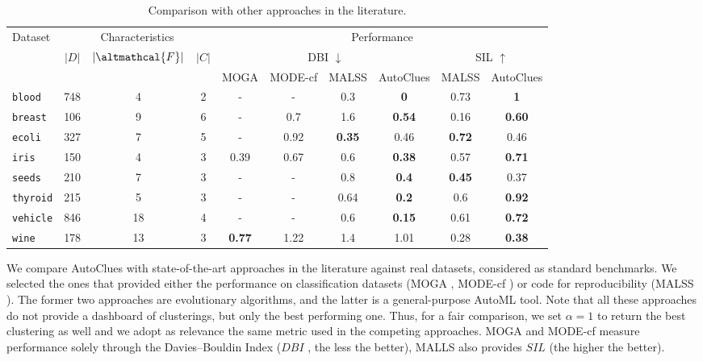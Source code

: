 \begin{table}[t]
    \centering
    \begin{tabular}{l|ccc|cccc|cc}
    \hline
        \multirow{3}{*}{Dataset} & \multicolumn{3}{c|}{Characteristics} & \multicolumn{6}{c}{Performance} \\
        & \multirow{2}{*}{$|D|$} & \multirow{2}{*}{$|\altmathcal{F}|$} & \multirow{2}{*}{$|C|$} & \multicolumn{4}{c|}{DBI $\downarrow$} & \multicolumn{2}{c}{SIL $\uparrow$} \\
        & & & & \multicolumn{1}{c}{MOGA} & \multicolumn{1}{c}{MODE-cf} & \multicolumn{1}{c}{MALSS} & \multicolumn{1}{c|}{AutoClues} & \multicolumn{1}{c}{MALSS} & \multicolumn{1}{c}{AutoClues} \\ \hline
        \texttt{blood} & 748 & 4 & 2 & - & - & 0.3 & \textbf{0} & 0.73 & \textbf{1} \\ 
        \texttt{breast} & 106 & 9 & 6 & - & 0.7 & 1.6 & \textbf{0.54} & 0.16 & \textbf{0.60} \\ 
        \texttt{ecoli} & 327 & 7 & 5 & - & 0.92 & \textbf{0.35} & 0.46 & \textbf{0.72} & 0.46 \\ 
        \texttt{iris} & 150 & 4 & 3 & 0.39 & 0.67 & 0.6 & \textbf{0.38} & 0.57 & \textbf{0.71} \\
        \texttt{seeds} & 210 & 7 & 3 & - & - & 0.8 & \textbf{0.4} & \textbf{0.45} & 0.37 \\
        \texttt{thyroid} & 215 & 5 & 3 & - & - & 0.64 & \textbf{0.2} & 0.6 & \textbf{0.92} \\ 
        \texttt{vehicle} & 846 & 18 & 4 & - & - & 0.6 & \textbf{0.15} & 0.61 & \textbf{0.72} \\ 
        \texttt{wine} & 178 & 13 & 3 & \textbf{0.77} & 1.22 & 1.4 & 1.01 & 0.28 & \textbf{0.38} \\ \hline
    \end{tabular}
    \caption{Comparison with other approaches in the literature.}
    \label{clustering-tbl:comparison}
\end{table}


We compare AutoClues with state-of-the-art approaches in the literature against real datasets, considered as standard benchmarks.
We selected the ones that provided either the performance on classification datasets (MOGA \cite{dutta2013}, MODE-cf \cite{hancer2020new}) or code for reproducibility (MALSS \cite{Kamoshida2020}).
The former two approaches are evolutionary algorithms, and the latter is a general-purpose AutoML tool.
Note that all these approaches do not provide a dashboard of clusterings, but only the best performing one.
Thus, for a fair comparison, we set $\alpha=1$ to return the best clustering as well and we adopt as relevance the same metric used in the competing approaches.
MOGA and MODE-cf measure performance solely through the Davies–Bouldin Index ($DBI$ \cite{dbi}, the less the better),
MALLS also provides $SIL$ (the higher the better).

